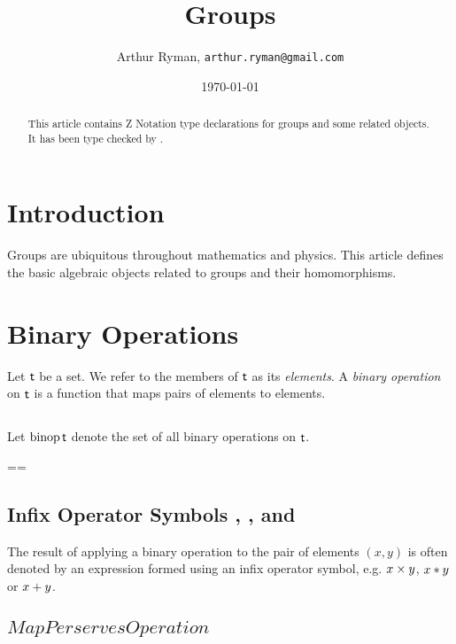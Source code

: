 \documentclass[11pt, oneside]{article}
\title{Groups}
\author{Arthur Ryman, {\tt arthur.ryman@gmail.com}}
\date{\today}
\begin{document}
\maketitle

\begin{abstract}
This article contains Z Notation type declarations for groups and some related objects.
It has been type checked by \fuzz.
\end{abstract}

\tableofcontents

\section{Introduction}

Groups are ubiquitous throughout mathematics and physics.
This article defines the basic algebraic objects related to groups and their homomorphisms.

\section{Binary Operations}

Let $\mathsf{t}$ be a set. We refer to the members of $\mathsf{t}$ as its {\em elements}.
A {\em binary operation} on $\mathsf{t}$ is a function that maps pairs of elements to elements.

\subsection{}

Let $\operatorname{binop} \mathsf{t}$ denote the set of all binary operations on $\mathsf{t}$.

\begin{zed}
\binop \genT == \genT \cross \genT \fun \genT
\end{zed}

\subsection{Infix Operator Symbols , , and }

The result of applying a binary operation to the pair of elements $(x, y)$ 
is often denoted by an expression formed using an infix operator symbol,
e.g. $x \mathbin{\times} y$, $x \mathbin{*} y$ or $x \mathbin{+} y$.

\subsection{$MapPerservesOperation$}
\end{document}
